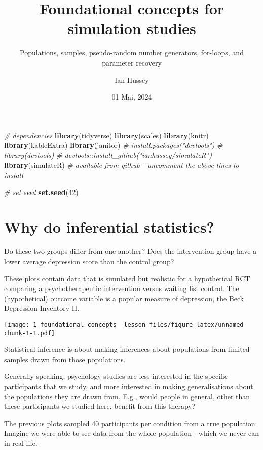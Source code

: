\documentclass[
]{article}
\title{Foundational concepts for simulation studies}
\subtitle{Populations, samples, pseudo-random number generators,
for-loops, and parameter recovery}
\author{Ian Hussey}
\date{01 Mai, 2024}
\newenvironment{Shaded}{\begin{snugshade}}{\end{snugshade}}
\newcommand{\CommentTok}[1]{\textcolor[rgb]{0.56,0.35,0.01}{\textit{#1}}}
\newcommand{\DecValTok}[1]{\textcolor[rgb]{0.00,0.00,0.81}{#1}}
\newcommand{\FunctionTok}[1]{\textcolor[rgb]{0.13,0.29,0.53}{\textbf{#1}}}
\newcommand{\NormalTok}[1]{#1}
\begin{document}
\maketitle

\begin{Shaded}
\begin{Highlighting}[]
\CommentTok{\# dependencies}
\FunctionTok{library}\NormalTok{(tidyverse)}
\FunctionTok{library}\NormalTok{(scales)}
\FunctionTok{library}\NormalTok{(knitr)}
\FunctionTok{library}\NormalTok{(kableExtra)}
\FunctionTok{library}\NormalTok{(janitor)}
\CommentTok{\# install.packages("devtools")}
\CommentTok{\# library(devtools)}
\CommentTok{\# devtools::install\_github("ianhussey/simulateR")}
\FunctionTok{library}\NormalTok{(simulateR) }\CommentTok{\# available from github {-} uncomment the above lines to install}

\CommentTok{\# set seed}
\FunctionTok{set.seed}\NormalTok{(}\DecValTok{42}\NormalTok{)}
\end{Highlighting}
\end{Shaded}

\hypertarget{why-do-inferential-statistics}{%
\section{Why do inferential
statistics?}\label{why-do-inferential-statistics}}

Do these two groups differ from one another? Does the intervention group
have a lower average depression score than the control group?

These plots contain data that is simulated but realistic for a
hypothetical RCT comparing a psychotherapeutic intervention versus
waiting list control. The (hypothetical) outcome variable is a popular
measure of depression, the Beck Depression Inventory II.

\texttt{[image: 1\_foundational\_concepts\_\_lesson\_files/figure-latex/unnamed-chunk-1-1.pdf]}

Statistical inference is about making inferences about populations from
limited samples drawn from those populations.

Generally speaking, psychology studies are less interested in the
specific participants that we study, and more interested in making
generalisations about the populations they are drawn from. E.g., would
people in general, other than these participants we studied here,
benefit from this therapy?

The previous plots sampled 40 participants per condition from a true
population. Imagine we were able to see data from the whole population -
which we never can in real life.
\end{document}
